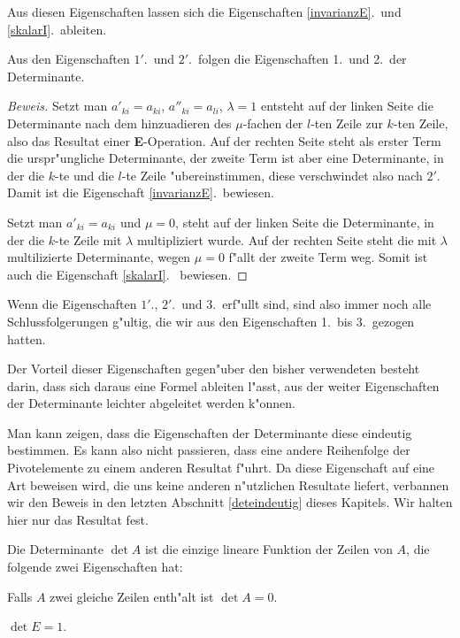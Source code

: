 Aus diesen Eigenschaften lassen sich die Eigenschaften \ref{invarianzE}.~und
\ref{skalarI}.~ableiten.

\begin{hilfssatz} Aus den Eigenschaften $1'$.~und $2'$.~folgen die Eigenschaften
1.~und 2.~der Determinante.
\end{hilfssatz}
\begin{proof}[Beweis]
Setzt man 
$a'_{ki}=a_{ki}$, $a''_{ki}=a_{li}$, $\lambda=1$ entsteht auf der linken Seite
die Determinante nach dem hinzuadieren des $\mu$-fachen der $l$-ten Zeile
zur $k$-ten Zeile, also das Resultat einer {\bf E}-Operation. Auf
der rechten Seite steht als erster Term die urspr"ungliche Determinante,
der zweite Term ist aber eine Determinante, in der die $k$-te und die
$l$-te Zeile "ubereinstimmen, diese verschwindet also nach $2'$. Damit
ist die Eigenschaft \ref{invarianzE}.~bewiesen.

Setzt man $a'_{ki}=a_{ki}$ und $\mu=0$, steht auf der linken Seite
die Determinante, in der die $k$-te Zeile mit $\lambda$ multipliziert
wurde. Auf der rechten Seite steht die mit $\lambda$ multilizierte
Determinante, wegen $\mu=0$ f"allt der zweite Term weg. Somit ist
auch die Eigenschaft \ref{skalarI}.~ bewiesen.
\end{proof}

Wenn die Eigenschaften $1'$., $2'$.~und 3.~erf"ullt sind, sind also immer
noch alle Schlussfolgerungen g"ultig, die wir aus den Eigenschaften
1.~bis 3.~gezogen hatten.

Der Vorteil dieser Eigenschaften gegen"uber den bisher verwendeten
besteht darin, dass sich daraus eine Formel ableiten l"asst, aus
der weiter Eigenschaften der Determinante leichter abgeleitet
werden k"onnen. 

Man kann zeigen, dass die Eigenschaften der Determinante diese
eindeutig bestimmen. Es kann also nicht passieren, dass eine andere
Reihenfolge der Pivotelemente zu einem anderen Resultat f"uhrt.
Da diese Eigenschaft auf eine Art beweisen wird, die uns keine
anderen n"utzlichen Resultate liefert, verbannen wir den Beweis
in den letzten Abschnitt \ref{deteindeutig} dieses Kapitels.
Wir halten hier nur das Resultat fest.

\begin{satz}
\label{detcharacterisation}
Die Determinante
$\det A$
ist die einzige lineare Funktion der Zeilen von $A$, die folgende zwei
Eigenschaften hat:
\begin{compactenum}
\item Falls $A$ zwei gleiche Zeilen enth"alt ist $\det A=0$.
\item $\det E = 1$.
\end{compactenum}
\end{satz}

